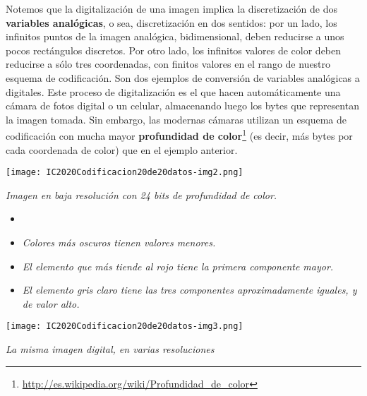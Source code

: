 \documentclass[a4paper]{article}
\newcommand\liststyleLiii{%
\renewcommand\labelitemi{{\textbullet}}
\renewcommand\labelitemii{${\circ}$}
\renewcommand\labelitemiii{${\blacksquare}$}
\renewcommand\labelitemiv{{\textbullet}}
}
\begin{document}
Notemos que la digitalizaci\'on de una imagen implica la
discretizaci\'on de dos \textbf{variables anal\'ogicas}, o sea,
discretizaci\'on en dos sentidos: por un lado, los infinitos puntos de
la imagen anal\'ogica, bidimensional, deben reducirse a unos pocos
rect\'angulos discretos. Por otro lado, los infinitos valores de color
deben reducirse a s\'olo tres coordenadas, con finitos valores en el
rango de nuestro esquema de codificaci\'on. Son dos ejemplos de
conversi\'on de variables anal\'ogicas a digitales. Este proceso de
digitalizaci\'on es el que hacen autom\'aticamente una c\'amara de
fotos digital o un celular, almacenando luego los bytes que representan
la imagen tomada. Sin embargo, las modernas c\'amaras utilizan un
esquema de codificaci\'on con mucha mayor \textbf{profundidad de
color}\footnote{\url{http://es.wikipedia.org/wiki/Profundidad_de_color}}
(es decir, m\'as bytes por cada coordenada de color) que en el ejemplo
anterior.


\bigskip



\begin{center}
\begin{minipage}{17.006cm}
{\centering

\texttt{[image: IC2020Codificacion20de20datos-img2.png]}
 
\par}


\bigskip

{\centering\itshape
Imagen en baja resoluci\'on con 24 bits de profundidad de color.
\par}

\liststyleLiii
\begin{itemize}
\item {}
\item {\itshape
Colores m\'as oscuros tienen valores menores.}
\item {\itshape
El elemento que m\'as tiende al rojo tiene la primera componente mayor.}
\item {\itshape
El elemento gris claro tiene las tres componentes aproximadamente
iguales, y de valor alto.}
\end{itemize}
\end{minipage}
\end{center}
\clearpage

\begin{center}
\begin{minipage}{17cm}


\texttt{[image: IC2020Codificacion20de20datos-img3.png]}{\centering\itshape
La misma imagen digital, en varias resoluciones
\par}
\end{minipage}
\end{center}
\end{document}
